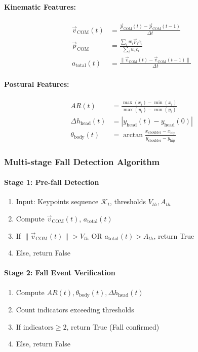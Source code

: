 \paragraph{Kinematic Features:}
\begin{align}
\vec{v}_{\text{COM}}(t) &= \frac{\vec{p}_{\text{COM}}(t) - \vec{p}_{\text{COM}}(t-1)}{\Delta t} \\
\vec{p}_{\text{COM}} &= \frac{\sum_i w_i \vec{p}_i c_i}{\sum_i w_i c_i} \\
a_{\text{total}}(t) &= \frac{\|\vec{v}_{\text{COM}}(t) - \vec{v}_{\text{COM}}(t-1)\|}{\Delta t}
\end{align}

\paragraph{Postural Features:}
\begin{align}
AR(t) &= \frac{\max(x_i)-\min(x_i)}{\max(y_i)-\min(y_i)} \\
\Delta h_{\text{head}}(t) &= |y_{\text{head}}(t) - y_{\text{head}}(0)| \\
\theta_{\text{body}}(t) &= \arctan\frac{x_{\text{shoulder}}-x_{\text{hip}}}{y_{\text{shoulder}}-y_{\text{hip}}}
\end{align}

\subsubsection{Multi-stage Fall Detection Algorithm}
\paragraph{Stage 1: Pre-fall Detection}
\begin{enumerate}
\item Input: Keypoints sequence $\mathcal{K}_t$, thresholds $V_{th}, A_{th}$
\item Compute $\vec{v}_{\text{COM}}(t)$, $a_{\text{total}}(t)$
\item If $\|\vec{v}_{\text{COM}}(t)\| > V_{th}$ OR $a_{\text{total}}(t) > A_{th}$, return True
\item Else, return False
\end{enumerate}

\paragraph{Stage 2: Fall Event Verification}
\begin{enumerate}
\item Compute $AR(t), \theta_{\text{body}}(t), \Delta h_{\text{head}}(t)$
\item Count indicators exceeding thresholds
\item If $\text{indicators} \ge 2$, return True (Fall confirmed)
\item Else, return False
\end{enumerate}

